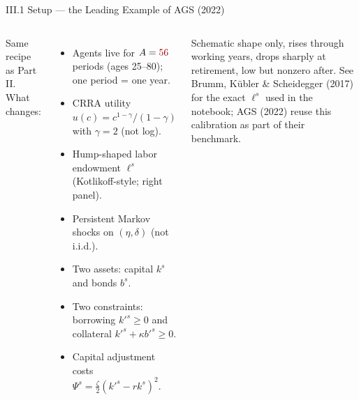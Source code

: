 \documentclass[aspectratio=169,11pt]{beamer}
\newcommand{\emphc}[1]{\textcolor{harvardcrimson}{#1}}
\begin{document}
\begin{frame}{III.1 Setup --- the Leading Example of AGS (2022)}
\small
\begin{columns}[T]
\emphc{Same recipe as Part II.  What changes:}
\begin{itemize}\itemsep1pt
    \item Agents live for $A = \emphc{56}$ periods (ages 25--80); one period = one year.
    \item CRRA utility $u(c) = c^{1-\gamma}/(1-\gamma)$ with $\gamma = 2$ (\emphc{not} log).
    \item \emphc{Hump-shaped labor endowment} $\ell^s$ (Kotlikoff-style; right panel).
    \item \emphc{Persistent} Markov shocks on $(\eta,\delta)$ (not i.i.d.).
    \item \emphc{Two assets}: capital $k^s$ and bonds $b^s$.
    \item \emphc{Two constraints}: borrowing $k'^s \ge 0$ and collateral $k'^s + \kappa b'^s \ge 0$.
    \item Capital adjustment costs $\Psi^s = \tfrac{\zeta}{2}(k'^s - r k^s)^2$.
\end{itemize}

\centering
{}

{\scriptsize \emphc{Schematic shape only}, rises through working years, drops sharply at retirement, low but nonzero after.  See \emphc{Brumm, K\"ubler \& Scheidegger (2017)} for the exact $\ell^s$ used in the notebook; AGS (2022) reuse this calibration as part of their benchmark.}
\end{columns}
\end{frame}
\end{document}
